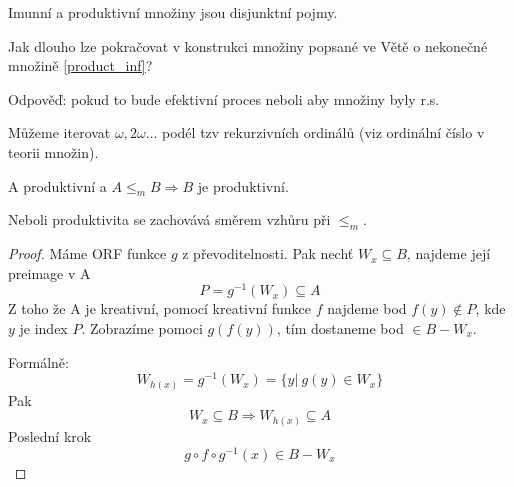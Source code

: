 \begin{note}
	Imunní a produktivní množiny jsou disjunktní pojmy.
\end{note}

\begin{amendment}
	Jak dlouho lze pokračovat v konstrukci množiny popsané ve Větě o nekonečné množině \cref{product_inf}?

	Odpověď: pokud to bude efektivní proces neboli aby množiny byly r.s.

	Můžeme iterovat $\omega, 2 \omega \ldots$ podél tzv rekurzivních ordinálů (viz ordinální číslo v teorii množin).
\end{amendment}

\begin{lemma}\label{prod_prev}
	A produktivní a $A \leq_m B \Rightarrow B$ je produktivní.

	Neboli produktivita se zachovává směrem vzhůru při $\leq_m$.
\end{lemma}
\begin{proof}
	Máme ORF funkce $g$ z převoditelnosti.
	Pak nechť $W_x \subseteq B$, najdeme její preimage v A
	\[ P = g^{-1}(W_x) \subseteq A \]
	Z toho že A je kreativní, pomocí kreativní funkce $f$ najdeme bod $f(y) \notin P$, kde $y$ je index $P$.
	Zobrazíme pomoci $g(f(y))$, tím dostaneme bod $\in B - W_x$.

	Formálně:
	\[ W_{h(x)} = g^{-1}(W_x) = \{ y |\ g(y) \in W_x \} \]
	Pak
	\[ W_x \subseteq B \Rightarrow W_{h(x)} \subseteq A \]
	Poslední krok
	\[ g \circ f \circ g^{-1} (x) \in B - W_x \]

\end{proof}


